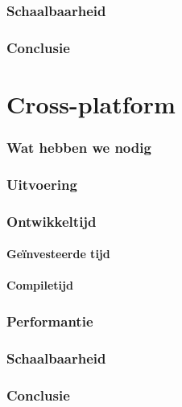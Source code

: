 \subsubsection{Schaalbaarheid}

\subsubsection{Conclusie}


\section{Cross-platform}
\subsubsection{Wat hebben we nodig}

\subsubsection{Uitvoering}

\subsubsection{Ontwikkeltijd}

\paragraph{Geïnvesteerde tijd}

\paragraph{Compiletijd}

\subsubsection{Performantie}

\subsubsection{Schaalbaarheid}

\subsubsection{Conclusie}






















